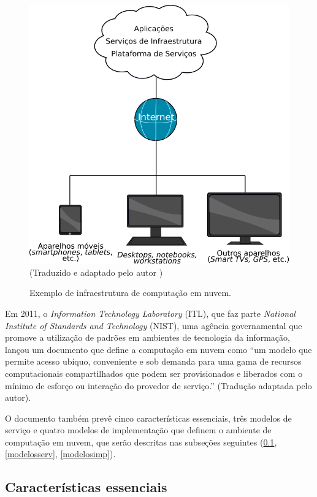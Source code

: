 \documentclass[
	12pt,				%
	a4paper,			%
	english,			%
	french,				%
	spanish,			%
	brazil				%
	]{abntex2}
\begin{document}
\begin{figure}[h]
	\caption{Exemplo de infraestrutura de computação em nuvem.}
	\includegraphics[scale=0.45]{compnuvem}
	\centering
	\label{fig:compnuvem}
	\\
	\centering \textual (Traduzido e adaptado pelo autor \cite{marston2011cloud})
\end{figure}

Em 2011, o \emph{Information Technology Laboratory} (ITL), que faz parte \emph{National Institute of Standards and Technology} (NIST), uma agência governamental que promove a utilização de padrões em ambientes de tecnologia da informação, lançou um documento que define a computação em nuvem como ``um modelo que permite acesso ubíquo, conveniente e sob demanda para uma gama de recursos computacionais compartilhados que podem ser provisionados e liberados com o mínimo de esforço ou interação do provedor de serviço.'' \cite[p. 2]{mell2011nist} (Tradução adaptada pelo autor).

O documento também prevê cinco características essenciais, três modelos de serviço e quatro modelos de implementação que definem o ambiente de computação em nuvem, que serão descritas nas subseções seguintes (\ref{caractessenciais}, \ref{modelosserv}, \ref{modelosimp}).

\subsection{Características essenciais}\label{caractessenciais}
\end{document}
